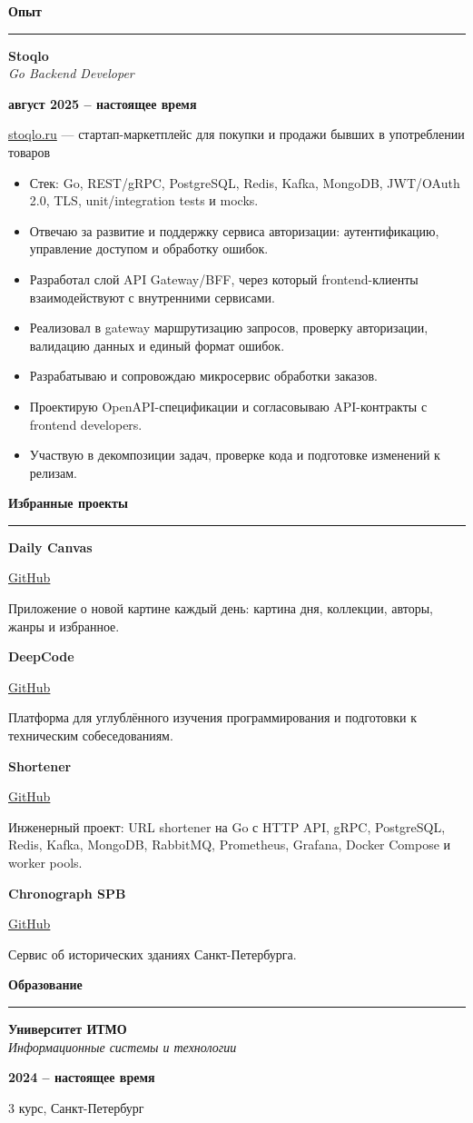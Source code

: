 \documentclass[10pt,a4paper]{article}
\newcommand{\resumesection}[1]{
  \vspace{3pt}
  {\large\bfseries\color{sectioncolor} #1}\par
  \vspace{1pt}
  \hrule
  \vspace{2pt}
}
\newcommand{\resumeEntry}[4]{
  \noindent
  \begin{minipage}[t]{0.69\textwidth}
    \textbf{#1}\\[-1pt]
    \textit{#3}
  \end{minipage}\hfill
  \begin{minipage}[t]{0.28\textwidth}
    \raggedleft
    {\small\textbf{#2}}
  \end{minipage}\par
  {\color{muted}\small #4}\par
}
\newcommand{\resumeProject}[3]{
  \noindent
  \begin{minipage}[t]{0.72\textwidth}
    \textbf{#1}
  \end{minipage}\hfill
  \begin{minipage}[t]{0.25\textwidth}
    \raggedleft
    \href{#3}{#2}
  \end{minipage}\par
}
\begin{document}
\resumesection{Опыт}
\resumeEntry
{Stoqlo}
{август 2025 -- настоящее время}
{Go Backend Developer}
{\href{https://stoqlo.ru}{stoqlo.ru} --- стартап-маркетплейс для покупки и продажи бывших в употреблении товаров}
\begin{itemize}
	\item Стек: Go, REST/gRPC, PostgreSQL, Redis, Kafka, MongoDB, JWT/OAuth 2.0, TLS, unit/integration tests и mocks.
	\item Отвечаю за развитие и поддержку сервиса авторизации: аутентификацию, управление доступом и обработку ошибок.
	\item Разработал слой API Gateway/BFF, через который frontend-клиенты взаимодействуют с внутренними сервисами.
	\item Реализовал в gateway маршрутизацию запросов, проверку авторизации, валидацию данных и единый формат ошибок.
	\item Разрабатываю и сопровождаю микросервис обработки заказов.
	\item Проектирую OpenAPI-спецификации и согласовываю API-контракты с frontend developers.
	\item Участвую в декомпозиции задач, проверке кода и подготовке изменений к релизам.
\end{itemize}

\resumesection{Избранные проекты}
\resumeProject{Daily Canvas}{GitHub}{https://github.com/n1ckerr0r/daily-canvas}
Приложение о новой картине каждый день: картина дня, коллекции, авторы, жанры и избранное.

\vspace{2pt}
\resumeProject{DeepCode}{GitHub}{https://github.com/n1ckerr0r/deepcode}
Платформа для углублённого изучения программирования и подготовки к техническим собеседованиям.

\vspace{2pt}
\resumeProject{Shortener}{GitHub}{https://github.com/n1ckerr0r/shortener}
Инженерный проект: URL shortener на Go с HTTP API, gRPC, PostgreSQL, Redis, Kafka, MongoDB, RabbitMQ, Prometheus, Grafana, Docker Compose и worker pools.

\vspace{2pt}
\resumeProject{Chronograph SPB}{GitHub}{https://github.com/n1ckerr0r/chronograph-spb}
Сервис об исторических зданиях Санкт-Петербурга.

\resumesection{Образование}
\resumeEntry
{Университет ИТМО}
{2024 -- настоящее время}
{Информационные системы и технологии}
{3 курс, Санкт-Петербург}
\end{document}
